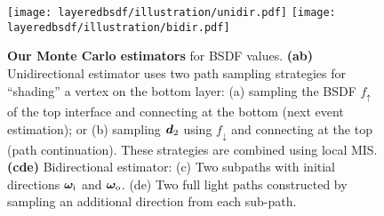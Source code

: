 \begin{figure}[h]
	\centering
	\texttt{[image: layeredbsdf/illustration/unidir.pdf]}
	\texttt{[image: layeredbsdf/illustration/bidir.pdf]}
	\caption[Our Monte Carlo estimators]{\label{fig:layeredbsdf:mc_estimators}
		\textbf{Our Monte Carlo estimators} for BSDF values.
		\textbf{(ab)} Unidirectional estimator uses two path sampling strategies for ``shading'' a vertex on the bottom layer:
		(a) sampling the BSDF $f_\uparrow$ of the top interface and connecting at the bottom (next event estimation); or (b) sampling $\bm{d}_2$ using $f_\downarrow$ and connecting at the top (path continuation). These strategies are combined using local MIS. \textbf{(cde)} Bidirectional estimator: (c) Two subpaths with initial directions $\bm\omega_\mathrm{i}$ and $\bm\omega_\mathrm{o}$. (de) Two full light paths constructed by sampling an additional direction from each sub-path.
	}
\end{figure}
